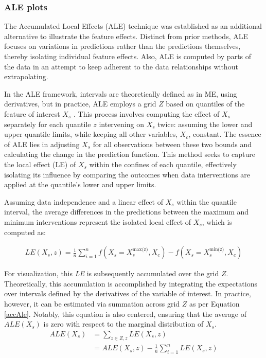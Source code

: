 \subsubsection{ALE plots}

The Accumulated Local Effects (\gls{ALE}) technique was established as an additional alternative to illustrate the feature effects. Distinct from prior methods, \gls{ALE} focuses on variations in predictions rather than the predictions themselves, thereby isolating individual feature effects. Also, \gls{ALE} is computed by parts of the data in an attempt to keep adherent to the data relationships without extrapolating. 

In the \gls{ALE} framework, intervals are theoretically defined as in \gls{ME}, using derivatives, but in practice, \gls{ALE} employs a grid \(Z\) based on quantiles of the feature of interest $X_s$ .  This process involves computing the effect of $X_s$ separately for each quantile $z$ intervening on $X_s$ twice: assuming the lower and upper quantile limits, while keeping all other variables, $X_c$, constant. The essence of \gls{ALE} lies in adjusting $X_s$ for all observations between these two bounds and calculating the change in the prediction function. This method seeks to capture the local effect (LE) of $X_s$ within the confines of each quantile, effectively isolating its influence by comparing the outcomes when data interventions are applied at the quantile's lower and upper limits.

Assuming data independence and a linear effect of $X_s$ within the quantile interval, the average differences in the predictions between the maximum and minimum interventions represent the isolated local effect of $X_s$, which is computed as:

\begin{equation}
\begin{aligned}
LE({X_s, z}) = \frac{1}{n}\sum_{i=1}^{n} f(X_s = X_s^{\text{max(z)}}, X_c) - f(X_s = X_s^{\text{min(z)}}, X_c)
\end{aligned}
\label{accAle}
\end{equation}


For visualization, this \textit{LE} is subsequently accumulated over the grid $Z$. Theoretically, this accumulation is accomplished by integrating the expectations over intervals defined by the derivatives of the variable of interest. In practice, however, it can be estimated via summation across grid $Z$ as per Equation \ref{accAle}. Notably, this equation is also centered, ensuring that the average of $ALE(X_s)$ is zero with respect to the marginal distribution of $X_s$. 
\begin{equation}
\begin{aligned}
ALE(X_s) &= \sum_{{z \in Z, z}} LE(X_s, z) \\
&= ALE(X_s,z) - \frac{1}{n}\sum_{i=1}^{n} LE(X_s,z)
\end{aligned}
\label{centerAle}
\end{equation}

